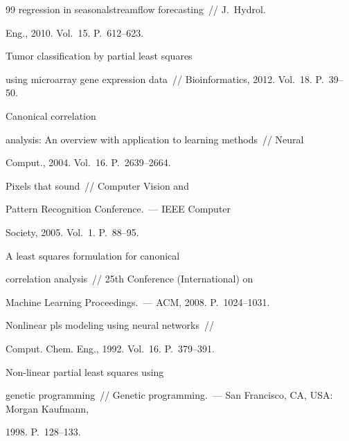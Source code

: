 {{\begin{thebibliography}{99}
regression in seasonalstreamflow forecasting~/\!\!/ J.~Hydrol. 

Eng., 2010. Vol.~15. P.~612--623.




 Tumor classification by partial least squares 

using microarray gene expression data~/\!\!/ Bioinformatics, 2012.  Vol.~18. P.~39--50.




 Canonical correlation 

analysis: An overview with application to learning methods~/\!\!/ Neural 

Comput., 2004. Vol.~16. P.~2639--2664.




 Pixels that sound~/\!\!/ Computer Vision and

Pattern Recognition Conference.~--- IEEE Computer 

Society, 2005. Vol.~1. P.~88--95.




 A least squares formulation for canonical 

correlation analysis~/\!\!/ 25th  Conference (International) on 

Machine Learning Proceedings.~--- ACM, 2008. P.~1024--1031.




 Nonlinear pls modeling using neural networks~/\!\!/ 

Comput. Chem. Eng., 1992. Vol.~16. P.~379--391.




 Non-linear partial least squares using 

genetic programming~/\!\!/ Genetic programming.~--- San Francisco, CA, USA: Morgan Kaufmann, 

1998. P.~128--133.





\end{thebibliography}}}
